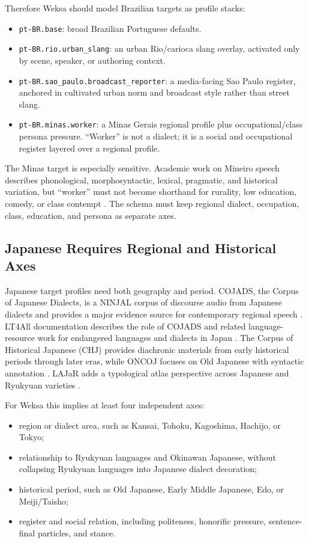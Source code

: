 \documentclass[11pt]{article}
\begin{document}
Therefore Weksa should model Brazilian targets as profile stacks:

\begin{itemize}[noitemsep]
  \item \texttt{pt-BR.base}: broad Brazilian Portuguese defaults.
  \item \texttt{pt-BR.rio.urban\_slang}: an urban Rio/carioca slang overlay,
  activated only by scene, speaker, or authoring context.
  \item \texttt{pt-BR.sao\_paulo.broadcast\_reporter}: a media-facing Sao
  Paulo register, anchored in cultivated urban norm and broadcast style rather
  than street slang.
  \item \texttt{pt-BR.minas.worker}: a Minas Gerais regional profile plus
  occupational/class persona pressure. ``Worker'' is not a dialect; it is a
  social and occupational register layered over a regional profile.
\end{itemize}

The Minas target is especially sensitive. Academic work on Mineiro speech
describes phonological, morphosyntactic, lexical, pragmatic, and historical
variation, but ``worker'' must not become shorthand for rurality, low
education, comedy, or class contempt \cite{mineiroVariation,mineiroHistoria}.
The schema must keep regional dialect, occupation, class, education, and persona
as separate axes.

\subsection{Japanese Requires Regional and Historical Axes}

Japanese target profiles need both geography and period. COJADS, the Corpus of
Japanese Dialects, is a NINJAL corpus of discourse audio from Japanese dialects
and provides a major evidence source for contemporary regional speech
\cite{cojads}. LT4All documentation describes the role of COJADS and related
language-resource work for endangered languages and dialects in Japan
\cite{lt4allJapan}. The Corpus of Historical Japanese (CHJ) provides diachronic
materials from early historical periods through later eras, while ONCOJ focuses
on Old Japanese with syntactic annotation \cite{chj,oncoj}. LAJaR adds a
typological atlas perspective across Japanese and Ryukyuan varieties
\cite{lajar2024}.

For Weksa this implies at least four independent axes:

\begin{itemize}[noitemsep]
  \item region or dialect area, such as Kansai, Tohoku, Kagoshima, Hachijo, or
  Tokyo;
  \item relationship to Ryukyuan languages and Okinawan Japanese, without
  collapsing Ryukyuan languages into Japanese dialect decoration;
  \item historical period, such as Old Japanese, Early Middle Japanese, Edo, or
  Meiji/Taisho;
  \item register and social relation, including politeness, honorific pressure,
  sentence-final particles, and stance.
\end{itemize}
\end{document}
